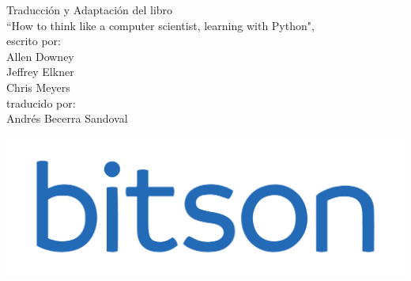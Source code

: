 \thispagestyle{empty} 

\vfill{}
\begin{center}
\textbf{\huge{}\introprog}
\par\end{center}{\huge \par}

\begin{center}
\vfill{}
\par\end{center}

\begin{center}
\textbf{\Large{}\AutorNombreCompleto}{\huge{} }
\par\end{center}{\huge \par}

\vfill{}
\begin{flushright}
{\small{}Traducción y Adaptación del libro }\\
{\small{}``How to think like a computer scientist, learning with Python", }\\
{\small{} escrito por: }\\
{\small{} Allen Downey}\\
{\small{} Jeffrey Elkner}\\
{\small{} Chris Meyers}\\
{\small{} traducido por: }\\
{\small{} Andrés Becerra Sandoval }\\
{\small{} } 
\par\end{flushright}

\vfill{}
\begin{center}
\includegraphics[scale=0.3]{illustrations/logotipo-alpha.png} 
\par\end{center}

\begin{center}
{\Large{}\BitsonCoop} 
\par\end{center}

